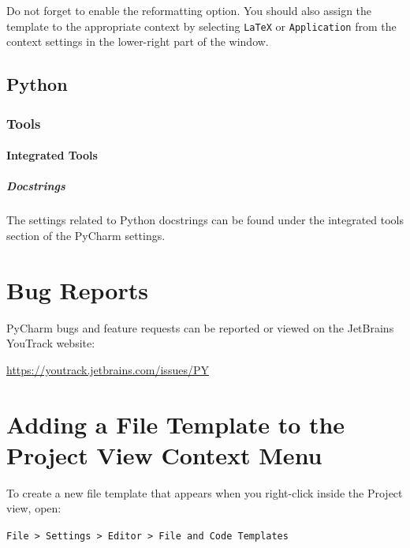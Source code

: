 \documentclass[a4paper]{article}
\begin{document}
                Do not forget to enable the reformatting option. You should also assign the
                template to the appropriate context by selecting \texttt{LaTeX} or
                \texttt{Application} from the context settings in the lower-right part of the
                window.
        
        \subsection{Python}
            
            \subsubsection{Tools}
                
                \paragraph{Integrated Tools}
                    
                    \subparagraph{Docstrings}
                        
                        The settings related to Python docstrings can be found under the integrated
                        tools section of the PyCharm settings.
    
    
    \section{Bug Reports}
        
        PyCharm bugs and feature requests can be reported or viewed on the JetBrains
        YouTrack website:
        
        \begin{center}
            \url{https://youtrack.jetbrains.com/issues/PY}
        \end{center}
    
    
    \section{Adding a File Template to the Project View Context Menu}
        
        To create a new file template that appears when you right-click inside the
        Project view, open:
        
        \begin{center}
            \texttt{File > Settings > Editor > File and Code Templates}
        \end{center}
        
\end{document}
